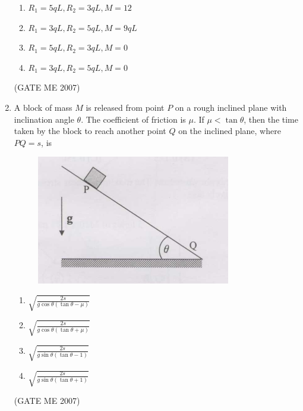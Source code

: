 \documentclass[journal]{IEEEtran}
\begin{document}
\begin{enumerate}
\begin{multicols}{2}
\begin{enumerate}
\item \( R_1 = 5qL, R_2 = 3qL, M = 12 \)
\item \( R_1 = 3qL, R_2 = 5qL, M = 9qL \)
\item \( R_1 = 5qL, R_2 = 3qL, M = 0 \)
\item \( R_1 = 3qL, R_2 = 5qL, M = 0 \)
\end{enumerate}
\end{multicols}
\hfill (GATE ME 2007)

\item A block of mass \( M \) is released from point \( P \) on a rough inclined plane with inclination angle \( \theta \). The coefficient of friction is \( \mu \). If \( \mu < \tan \theta \), then the time taken by the block to reach another point \( Q \) on the inclined plane, where \( PQ = s \), is

\begin{figure}[H]
    \centering
    \includegraphics[width=0.8\textwidth]{Fig 3.png}
    \caption{}
    \label{fig:question43}
\end{figure}

\begin{multicols}{2}
\begin{enumerate}
\item \( \sqrt{\frac{2s}{g \cos \theta (\tan \theta - \mu)}} \)
\item \( \sqrt{\frac{2s}{g \cos \theta (\tan \theta + \mu)}} \)
\item \( \sqrt{\frac{2s}{g \sin \theta (\tan \theta - 1)}} \)
\item \( \sqrt{\frac{2s}{g \sin \theta (\tan \theta + 1)}} \)
\end{enumerate}
\end{multicols}
\hfill (GATE ME 2007)


\end{enumerate}
\end{document}
